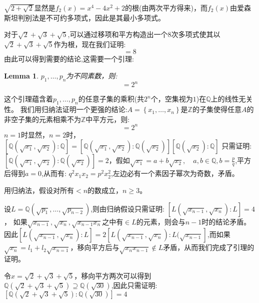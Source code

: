 \documentclass[12pt, a4paper]{ctexart}
\newenvironment{prooff}{{\noindent\it\textcolor{cyan!40!black}{Proof}:}\quad}{\par}
\newcommand{\bbrace}[1]{\left\{ #1 \right\} }
\newcommand{\bb}[1]{$\mathbb{#1}$}
\newtheorem{lem}{Lemma}[section]
\begin{document}
\begin{prooff}
    $\sqrt{2+\sqrt{2}}$显然是$f_2(x)=x^4-4x^2+2$的根(由两次平方得来)，而$f_2(x)$由爱森斯坦判别法是不可约多项式，因此是其最小多项式。

    对于$\sqrt{2}+\sqrt{3}+\sqrt{5}$,可以通过移项和平方构造出一个8次多项式使其以$\sqrt{2}+\sqrt{3}+\sqrt{5}$作为根，现在我们证明:
    \begin{equation*}
        [\mathbb{Q}(\sqrt{2}+\sqrt{3}+\sqrt{5}):\mathbb{Q}]=8
    \end{equation*}
    由此可以得到需要的结论,这需要一个引理:
    \begin{lem}
        $p_1,\dots,p_n$为不同素数，则:
        \begin{equation*}
            [\mathbb{Q}(\sqrt{p_1},\dots,\sqrt{p_n}):\mathbb{Q}]=2^n
        \end{equation*}
        \label{lem1.1}
    \end{lem}
    这个引理蕴含着$p_1,\dots,p_n$的任意子集的乘积(共$2^n$个，空集视为$1$)在\bb{Q}上的线性无关性。
    我们用归纳法证明一个更强的结论:$A=\bbrace{x_1,\dots,x_n}$是\bb{Z}的子集使得任意$A$的非空子集的元素相乘不为\bb{Z}中平方元，则:
    \begin{equation*}
        [\mathbb{Q}(\sqrt{x_1},\dots,\sqrt{x_n}):\mathbb{Q}]=2^n
    \end{equation*}
    $n=1$时显然，$n=2$时，$[\mathbb{Q}(\sqrt{x_1},\sqrt{x_2}):\mathbb{Q}]=[\mathbb{Q}(\sqrt{x_1},\sqrt{x_2}):\mathbb{Q}(\sqrt{x_2})][\mathbb{Q}(\sqrt{x_2}):\mathbb{Q}]$
    只需证明:$[\mathbb{Q}(\sqrt{x_1},\sqrt{x_2}):\mathbb{Q}(\sqrt{x_2})]=2$，假如$\sqrt{x_1}=a+b\sqrt{x_2},\quad a,b\in \mathbb{Q},b=\frac{p}{q}$,平方后得到$a=0$,从而有:
    $q^2x_1x_2=p^2x_2^2$,左边必有一个素因子幂次为奇数，矛盾。

    用归纳法，假设对所有$<n$的数成立，$n\ge 3$。

    设$L= \mathbb{Q}(\sqrt{p_1},\dots,\sqrt{p_{n-2}})$,则由归纳假设只需证明:
    $[L(\sqrt{x_{n-1}},\sqrt{x_n}):L]=4$，
    如果$\sqrt{x_{n-1}},\sqrt{x_n},\sqrt{x_{n-1}x_n}$之中有$\in L$的元素，则会与$n-1$时的结论矛盾。
    因此$[L(\sqrt{x_{n-1}},\sqrt{x_n}):L]=2[L(\sqrt{x_{n-1}},\sqrt{x_n}):L(\sqrt{x_{n-1}}]$,而如果$\sqrt{x_n}=l_1+l_2\sqrt{x_{n=1}}$，移向平方后与$\sqrt{x_nx_{n-1}}\notin L$矛盾，从而我们完成了引理的证明。

    令$x=\sqrt{2}+\sqrt{3}+\sqrt{5}$，移向平方两次可以得到$\mathbb{Q}(\sqrt{2}+\sqrt{3}+\sqrt{5})\supseteq \mathbb{Q}(\sqrt{30}) $,因此只需证明:
    $[\mathbb{Q}(\sqrt{2}+\sqrt{3}+\sqrt{5}):\mathbb{Q}(\sqrt{30})]=4$


\end{prooff}
\end{document}

